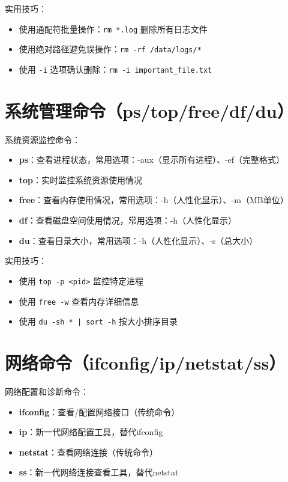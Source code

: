 \documentclass[12pt,UTF8]{ctexbook}
\begin{document}
实用技巧：
\begin{itemize}
    \item 使用通配符批量操作：\texttt{rm *.log} 删除所有日志文件
    \item 使用绝对路径避免误操作：\texttt{rm -rf /data/logs/*}
    \item 使用 \texttt{-i} 选项确认删除：\texttt{rm -i important\_file.txt}
\end{itemize}

\section{系统管理命令（ps/top/free/df/du）}
\label{sec:sys-cmds}

系统资源监控命令：

\begin{itemize}
    \item \textbf{ps}：查看进程状态，常用选项：-aux（显示所有进程）、-ef（完整格式）
    \item \textbf{top}：实时监控系统资源使用情况
    \item \textbf{free}：查看内存使用情况，常用选项：-h（人性化显示）、-m（MB单位）
    \item \textbf{df}：查看磁盘空间使用情况，常用选项：-h（人性化显示）
    \item \textbf{du}：查看目录大小，常用选项：-h（人性化显示）、-s（总大小）
\end{itemize}

实用技巧：
\begin{itemize}
    \item 使用 \texttt{top -p <pid>} 监控特定进程
    \item 使用 \texttt{free -w} 查看内存详细信息
    \item 使用 \texttt{du -sh * | sort -h} 按大小排序目录
\end{itemize}

\section{网络命令（ifconfig/ip/netstat/ss）}
\label{sec:net-cmds}

网络配置和诊断命令：

\begin{itemize}
    \item \textbf{ifconfig}：查看/配置网络接口（传统命令）
    \item \textbf{ip}：新一代网络配置工具，替代ifconfig
    \item \textbf{netstat}：查看网络连接（传统命令）
    \item \textbf{ss}：新一代网络连接查看工具，替代netstat
\end{itemize}
\end{document}
